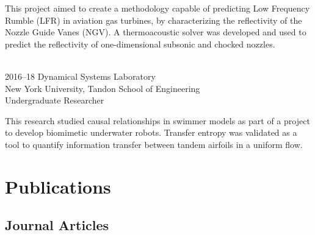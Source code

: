 \documentclass[12pt,letterpaper]{report}
\newcommand{\listitemspace}{0.25em}
\renewenvironment{itemize}
{\begin{list}{}{\setlength{\leftmargin}{0em}
                \setlength{\parskip}{0em}
                \setlength{\itemsep}{\listitemspace}
                \setlength{\parsep}{\listitemspace}}}
{\end{list}}
\begin{document}
\begin{tablist}
		This project aimed to create a methodology capable of
predicting Low Frequency Rumble (LFR) in aviation gas turbines, by characterizing the reflectivity of the Nozzle Guide Vanes (NGV). A thermoacoustic solver was developed and used to predict the reflectivity of one-dimensional subsonic and chocked nozzles. \\\ 

        \item[2016--18] \tab{}Dynamical Systems Laboratory \\ 
        New York University, Tandon School of Engineering \\ 
        Undergraduate Researcher \\
        
  \vspace{1.5mm}
  
        This research studied causal relationships in swimmer models as part of a project to develop biomimetic underwater robots. Transfer entropy was validated as a tool to quantify  information transfer between tandem airfoils in a uniform flow. 

    \end{tablist}


%
%
%



    \section*{Publications}
    
    \subsection*{Journal Articles}
        \nocite{*}
        \printbibliography[type=article,heading=none,resetnumbers]
\end{document}
